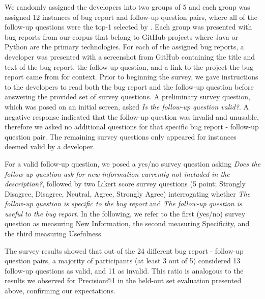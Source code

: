 We randomly assigned the developers into two groups of 5 and each group was assigned 12 instances of bug report and follow-up question pairs, where all of the follow-up questions were the top-1 selected by \evpi. Each group was presented with bug reports from our corpus that belong to GitHub projects where Java or Python are the primary technologies. For each of the assigned bug reports, a developer
was presented with a screenshot from GitHub containing the title and text of the bug report, the follow-up question, and a link to the project the bug report came from for context. Prior to beginning the survey, we gave instructions to the developers to read both the bug report and the follow-up question before answering the provided set of survey questions. A preliminary survey question, which was posed on an initial screen, asked {\em Is the follow-up question valid?}. A negative response indicated that the follow-up question was invalid and unusable, therefore we asked no additional questions for that specific bug report - follow-up question pair. The remaining survey questions only appeared for instances deemed valid by a developer.

For a valid follow-up question, we posed a yes/no survey question asking {\em Does the follow-up question ask for new information currently not included in the description?}, followed by two Likert score survey questions (5 point; Strongly Disagree, Disagree, Neutral, Agree, Strongly Agree) interrogating whether {\em The follow-up question is specific to the bug report} and {\em The follow-up question is useful to the bug report}. In the following, we refer to the first (yes/no) survey question as measuring New Information, the second measuring Specificity, and the third measuring Usefulness.

The survey results showed that out of the 24 different bug report - follow-up question pairs, a majority of participants (at least 3 out of 5) considered 13 follow-up questions as valid, and 11 as invalid. This ratio is analogous to the results we observed for Precision@1 in the held-out set evaluation presented above, confirming our expectations.

